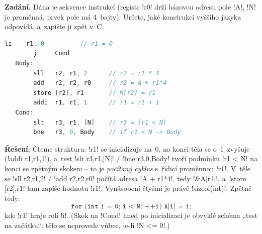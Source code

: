 \begin{priklad}
\textbf{Zadání.} Dána je sekvence instrukcí (registr \cd!r0! drží bázovou adresu pole \cd!A!, \cd!N! je proměnná, prvek pole má 4~bajty). Určete, jaké konstrukci vyššího jazyka odpovídá, a~zapište ji zpět v~C.
\begin{lstlisting}[language=C]
        li    r1, 0          // r1 = 0
        j     Cond
   Body:
        sll   r2, r1, 2      // r2 = r1 * 4
        add   r2, r2, r0     // r2 = A + r1*4
        store [r2], r1       // M[r2] = r1
        addi  r1, r1, 1      // r1 = r1 + 1
   Cond:
        slt   r3, r1, [N]    // r3 = (r1 < N)
        bne   r3, 0, Body    // if r1 < N -> Body
\end{lstlisting}

\medskip
\textbf{Řešení.} Čteme strukturu: \cd!r1! se inicializuje na~0, na konci těla se o~1~zvyšuje (\cd!addi r1,r1,1!), a~test \cd!slt r3,r1,[N]! / \cd!bne r3,0,Body! tvoří podmínku \cd!r1 < N! na konci se zpětným skokem -- to je \emph{počítaný cyklus} s~řídicí proměnnou \cd!r1!. V~těle se \cd!sll r2,r1,2! / \cd!add r2,r2,r0! počítá adresa \cd!A + r1*4!, tedy \cd!&A[r1]!, a~\cd!store [r2],r1! tam zapíše hodnotu \cd!r1!. Vynásobení čtyřmi je právě \cd!sizeof(int)!. Zpětně tedy:
\[
\boxed{\texttt{for (int i = 0; i < N; ++i) A[i] = i;}}
\]
kde \cd!r1! hraje roli \cd!i!. (Skok na \cd!Cond! hned po inicializaci je obvyklé schéma „test na začátku``: tělo se neprovede vůbec, je-li \cd!N <= 0!.)
\end{priklad}
